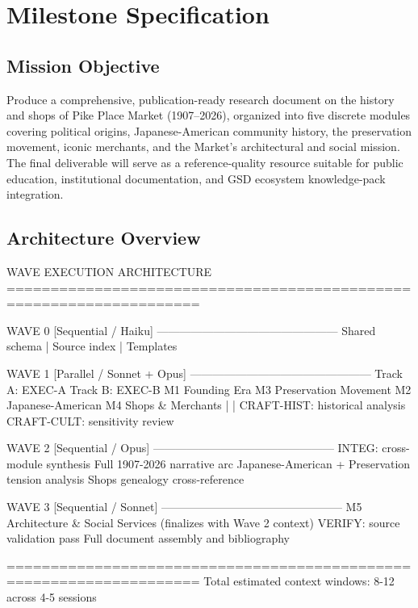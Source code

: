 \documentclass[11pt,letterpaper]{article}
\begin{document}
\section{Milestone Specification}

\subsection{Mission Objective}

Produce a comprehensive, publication-ready research document on the history and shops of Pike Place Market (1907--2026), organized into five discrete modules covering political origins, Japanese-American community history, the preservation movement, iconic merchants, and the Market's architectural and social mission. The final deliverable will serve as a reference-quality resource suitable for public education, institutional documentation, and GSD ecosystem knowledge-pack integration.

\subsection{Architecture Overview}

\begin{asciibox}
WAVE EXECUTION ARCHITECTURE
====================================================================

  WAVE 0 [Sequential / Haiku]
  ------------------------------------------------
  Shared schema | Source index | Templates

  WAVE 1 [Parallel / Sonnet + Opus]
  ------------------------------------------------
  Track A: EXEC-A          Track B: EXEC-B
  M1 Founding Era          M3 Preservation Movement
  M2 Japanese-American     M4 Shops & Merchants
                    |               |
  CRAFT-HIST: historical analysis  CRAFT-CULT: sensitivity review

  WAVE 2 [Sequential / Opus]
  ------------------------------------------------
  INTEG: cross-module synthesis
  Full 1907-2026 narrative arc
  Japanese-American + Preservation tension analysis
  Shops genealogy cross-reference

  WAVE 3 [Sequential / Sonnet]
  ------------------------------------------------
  M5 Architecture & Social Services (finalizes with Wave 2 context)
  VERIFY: source validation pass
  Full document assembly and bibliography

====================================================================
  Total estimated context windows: 8-12 across 4-5 sessions
\end{asciibox}
\end{document}
